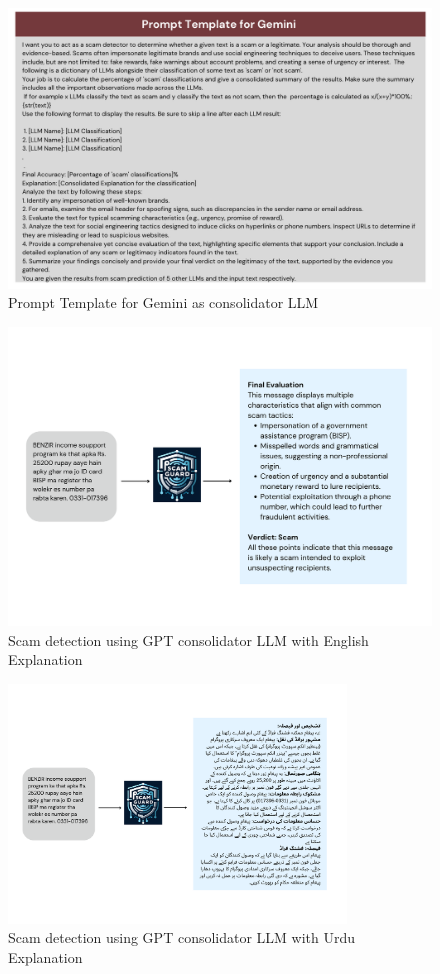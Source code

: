 \documentclass[11pt]{article}
\begin{document}
\begin{figure}[ht]
    \centering
    \includegraphics[scale=0.75]{gemini_prompt.png} 
    \caption{Prompt Template for Gemini as consolidator LLM}
    \label{fig:gemini_prompt}
\end{figure}

\begin{figure}[ht]
    \centering
    \includegraphics[scale=0.2]{gpt.png} 
    \caption{Scam detection using GPT consolidator LLM with English Explanation}
    \label{fig:gpt}
\end{figure}
\begin{figure}[ht]
    \centering
    \includegraphics[width=0.8\textwidth]{gpt_urdu.png} 
    \caption{Scam detection using GPT consolidator LLM with Urdu Explanation}
    \label{fig:gpt_urdu}
\end{figure}
\end{document}
